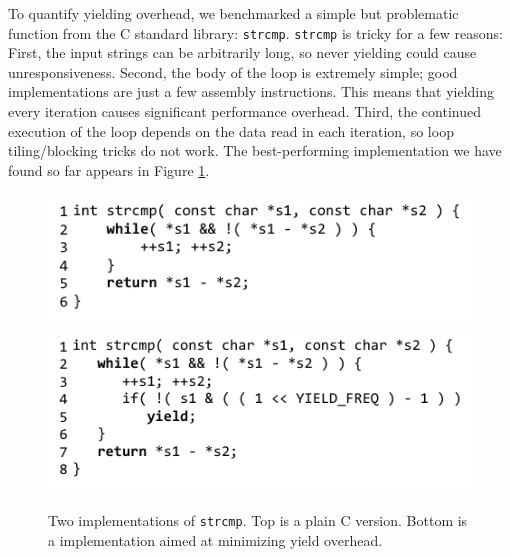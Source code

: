\documentclass[acmsmall,anonymous,review]{acmart}\settopmatter{printfolios=true,printccs=false,printacmref=false}
\begin{document}
To quantify yielding overhead, we benchmarked a simple but problematic function from the C standard library: \texttt{strcmp}.
\texttt{strcmp} is tricky for a few reasons:
First, the input strings can be arbitrarily long, so never yielding could cause unresponsiveness.
Second, the body of the loop is extremely simple; good implementations are just a few assembly instructions.
This means that yielding every iteration causes significant performance overhead.
Third, the continued execution of the loop depends on the data read in each iteration, so loop tiling/blocking tricks do not work.
The best-performing implementation we have found so far appears in Figure \ref{fig:strcmp}.

\begin{figure}[htp]
\includegraphics[left]{Code/plain_strcmp}%
  \\
\includegraphics[left]{Code/strcmp_benchmark}%
\caption{Two implementations of \texttt{strcmp}.
  Top is a plain C version.
  Bottom is a \charcoal{} implementation aimed at minimizing yield overhead.}

\label{fig:strcmp}

\end{figure}


\end{document}
